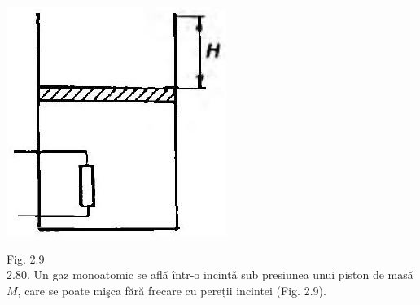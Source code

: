 \documentclass[10pt]{article}
\begin{document}
\includegraphics[max width=\textwidth, center]{2025_07_01_5b3ff9fa0d508c8e9f17g-090}

Fig. 2.9\\
2.80. Un gaz monoatomic se află într-o incintă sub presiunea unui piston de masă $M$, care se poate mişca fără frecare cu pereții incintei (Fig. 2.9).
\end{document}
